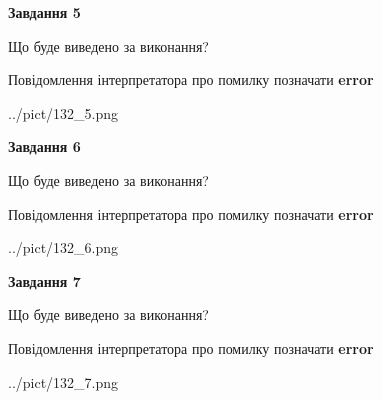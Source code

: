 \documentclass[10pt, ukrainian]{article}
\begin{document}
{\begin {large}
{\begin {center}\textbf{Завдання 5}\end {center}}\par
Що буде виведено за виконання? \par
Повідомлення інтерпретатора про помилку позначати \textbf{error}

\begin{center}
	{../pict/132_5.png}
\end{center}
\newpage

{\begin {center}\textbf{Завдання 6}\end {center}}\par
Що буде виведено за виконання? \par
Повідомлення інтерпретатора про помилку позначати \textbf{error}

\begin{center}
	{../pict/132_6.png}
\end{center}
\newpage

{\begin {center}\textbf{Завдання 7}\end {center}}\par
Що буде виведено за виконання? \par
Повідомлення інтерпретатора про помилку позначати \textbf{error}

\begin{center}
	{../pict/132_7.png}
\end{center}
\newpage

\end {large}}
\end{document}

